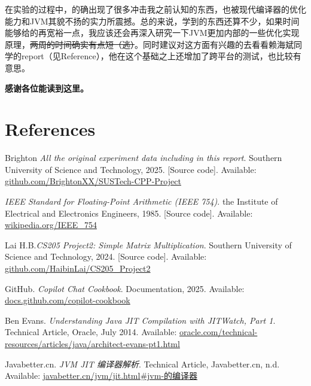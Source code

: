 \documentclass[11pt]{article}
\begin{document}
在实验的过程中，的确出现了很多冲击我之前认知的东西，也被现代编译器的优化能力和JVM其貌不扬的实力所震撼。总的来说，学到的东西还算不少，如果时间能够给的再宽裕一点，我应该还会再深入研究一下JVM更加内部的一些优化实现原理，\sout{两周的时间确实有点短（逃）}。同时建议对这方面有兴趣的去看看赖海斌同学的report（见Reference），他在这个基础之上还增加了跨平台的测试，也比较有意思。


\textbf{感谢各位能读到这里。}
\newpage %
\section*{References}
\begin{thebibliography}{9}

 Brighton 
\textit{All the original experiment data including in this report}. 
Southern University of Science and Technology, 2025. 
[Source code]. Available: 
\href{https://github.com/BrightonXX/SUSTech-CPP-Project}{github.com/BrightonXX/SUSTech-CPP-Project} 


\textit{IEEE Standard for Floating-Point Arithmetic (IEEE 754)}. 
the Institute of Electrical and Electronics Engineers, 1985. 
[Source code]. Available: 
\href{https://en.wikipedia.org/wiki/IEEE_754}{wikipedia.org/IEEE\_754} 

Lai H.B.\textit{CS205 Project2: Simple Matrix Multiplication}. 
Southern University of Science and Technology, 2024. 
[Source code]. Available: 
\href{https://github.com/HaibinLai/CS205-CPP-Programing-Project}{github.com/HaibinLai/CS205\_Project2} 

GitHub. \textit{Copilot Chat Cookbook}. 
Documentation, 2025. 
Available: 
\href{https://docs.github.com/en/copilot/copilot-chat-cookbook}{docs.github.com/copilot-cookbook} 

Ben Evans. \textit{Understanding Java JIT Compilation with JITWatch, Part 1}.  
Technical Article, Oracle, July 2014.  
Available: 
\href{https://www.oracle.com/technical-resources/articles/java/architect-evans-pt1.html}{oracle.com/technical-resources/articles/java/architect-evans-pt1.html}

 Javabetter.cn. \textit{JVM JIT 编译器解析}. Technical Article, Javabetter.cn, n.d. Available: \href{https://javabetter.cn/jvm/jit.html#jvm-%E7%9A%84%E7%BC%96%E8%AF%91%E5%99%A8}{javabetter.cn/jvm/jit.html#jvm-的编译器}

\end{thebibliography}
\end{document}
